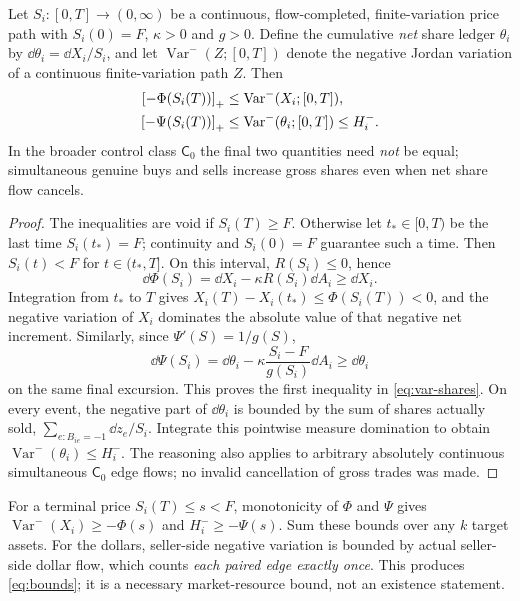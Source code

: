 \documentclass[review,hidelinks,onefignum,onetabnum]{siamonline250211}%
\begin{document}
\begin{lemma}
\label{lem:one-sided-bv}
Let $S_i:[0,T]\to(0,\infty)$ be a continuous,
flow-completed, finite-variation price path with $S_i(0)=F$,
$\kappa>0$ and $g>0$. Define the cumulative \emph{net} share
ledger $\theta_i$ by $\dd\theta_i=\dd X_i/S_i$, and let
$\operatorname{Var}^-(Z;[0,T])$ denote the negative Jordan
variation of a continuous finite-variation path $Z$. Then
\begin{align}
 \left[-\Phi(S_i(T))\right]_+
 &\le\operatorname{Var}^-(X_i;[0,T]),
 \label{eq:var-dollar}\\
 \left[-\Psi(S_i(T))\right]_+
 &\le\operatorname{Var}^-(\theta_i;[0,T])
 \le H_i^-.
 \label{eq:var-shares}
\end{align}
In the broader control class $\mathsf C_0$ the final two
quantities need \emph{not} be equal; simultaneous genuine buys
and sells increase gross shares even when net share flow cancels.
\end{lemma}
\begin{proof}
The inequalities are void if $S_i(T)\ge F$. Otherwise let
$t_*\in[0,T)$ be the last time $S_i(t_*)=F$; continuity and
$S_i(0)=F$ guarantee such a time. Then $S_i(t)<F$ for
$t\in(t_*,T]$. On this interval, $R(S_i)\le0$, hence
\[
 \dd\Phi(S_i)=\dd X_i-\kappa R(S_i)\dd A_i\ge\dd X_i.
\]
Integration from $t_*$ to $T$ gives
$X_i(T)-X_i(t_*)\le\Phi(S_i(T))<0$, and the negative
variation of $X_i$ dominates the absolute value of that
negative net increment. Similarly, since
$\Psi'(S)=1/g(S)$,
\[
 \dd\Psi(S_i)=\dd\theta_i
       -\kappa\frac{S_i-F}{g(S_i)}\dd A_i\ge\dd\theta_i
\]
on the same final excursion. This proves the first inequality
in \eqref{eq:var-shares}. On every event, the negative part of
$\dd\theta_i$ is bounded by the sum of shares actually sold,
$\sum_{e:B_{ie}=-1}\dd z_e/S_i$. Integrate this pointwise
measure domination to obtain
$\operatorname{Var}^-(\theta_i)\le H_i^-$. The reasoning
also applies to arbitrary absolutely continuous simultaneous
$\mathsf C_0$ edge flows; no invalid cancellation of gross
trades was made.
\end{proof}

For a terminal price $S_i(T)\le s<F$, monotonicity of
$\Phi$ and $\Psi$ gives
$\operatorname{Var}^-(X_i)\ge-\Phi(s)$ and
$H_i^-\ge-\Psi(s)$. Sum these bounds over any $k$ target
assets. For the dollars, seller-side negative variation is
bounded by actual seller-side dollar flow, which counts
\emph{each paired edge exactly once}. This produces
\eqref{eq:bounds}; it is a necessary market-resource bound,
not an existence statement.
\end{document}
